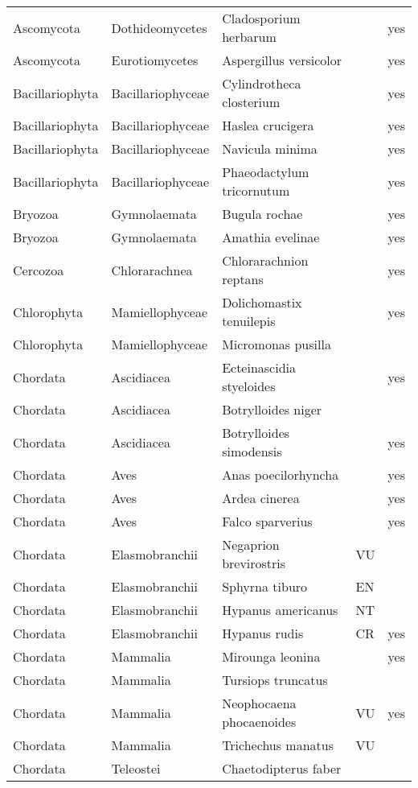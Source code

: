 \begin{longtable}{lllll}
  Ascomycota & Dothideomycetes & Cladosporium herbarum &  & yes \\ 
  Ascomycota & Eurotiomycetes & Aspergillus versicolor &  & yes \\ 
  Bacillariophyta & Bacillariophyceae & Cylindrotheca closterium &  & yes \\ 
  Bacillariophyta & Bacillariophyceae & Haslea crucigera &  & yes \\ 
  Bacillariophyta & Bacillariophyceae & Navicula minima &  & yes \\ 
  Bacillariophyta & Bacillariophyceae & Phaeodactylum tricornutum &  & yes \\ 
  Bryozoa & Gymnolaemata & Bugula rochae &  & yes \\ 
  Bryozoa & Gymnolaemata & Amathia evelinae &  & yes \\ 
  Cercozoa & Chlorarachnea & Chlorarachnion reptans &  & yes \\ 
  Chlorophyta & Mamiellophyceae & Dolichomastix tenuilepis &  & yes \\ 
  Chlorophyta & Mamiellophyceae & Micromonas pusilla &  &  \\ 
  Chordata & Ascidiacea & Ecteinascidia styeloides &  & yes \\ 
  Chordata & Ascidiacea & Botrylloides niger &  &  \\ 
  Chordata & Ascidiacea & Botrylloides simodensis &  & yes \\ 
  Chordata & Aves & Anas poecilorhyncha &  & yes \\ 
  Chordata & Aves & Ardea cinerea &  & yes \\ 
  Chordata & Aves & Falco sparverius &  & yes \\ 
  Chordata & Elasmobranchii & Negaprion brevirostris & VU &  \\ 
  Chordata & Elasmobranchii & Sphyrna tiburo & EN &  \\ 
  Chordata & Elasmobranchii & Hypanus americanus & NT &  \\ 
  Chordata & Elasmobranchii & Hypanus rudis & CR & yes \\ 
  Chordata & Mammalia & Mirounga leonina &  & yes \\ 
  Chordata & Mammalia & Tursiops truncatus &  &  \\ 
  Chordata & Mammalia & Neophocaena phocaenoides & VU & yes \\ 
  Chordata & Mammalia & Trichechus manatus & VU &  \\ 
  Chordata & Teleostei & Chaetodipterus faber &  &  \\ 

\end{longtable}
